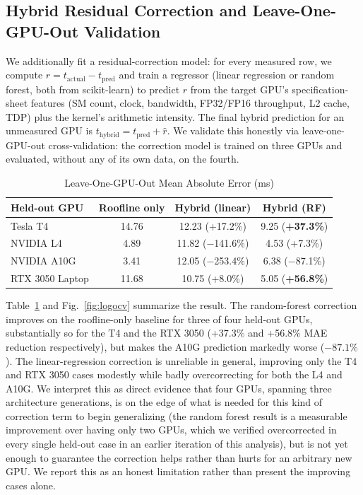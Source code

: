 \documentclass[conference]{IEEEtran}
\begin{document}
\subsection{Hybrid Residual Correction and Leave-One-GPU-Out Validation}

We additionally fit a residual-correction model: for every measured row, we compute
$r = t_{\text{actual}} - t_{\text{pred}}$ and train a regressor (linear regression or random
forest, both from scikit-learn) to predict $r$ from the target GPU's specification-sheet features
(SM count, clock, bandwidth, FP32/FP16 throughput, L2 cache, TDP) plus the kernel's arithmetic
intensity. The final hybrid prediction for an unmeasured GPU is
$t_{\text{hybrid}} = t_{\text{pred}} + \hat{r}$. We validate this honestly via leave-one-GPU-out
cross-validation: the correction model is trained on three GPUs and evaluated, without any of its
own data, on the fourth.

\begin{table}[htbp]
\caption{Leave-One-GPU-Out Mean Absolute Error (ms)}
\label{tab:logocv}
\centering
\begin{tabular}{@{}lccc@{}}
\toprule
Held-out GPU & Roofline only & Hybrid (linear) & Hybrid (RF) \\
\midrule
Tesla T4 & 14.76 & 12.23 (+17.2\%) & 9.25 (\textbf{+37.3\%}) \\
NVIDIA L4 & 4.89 & 11.82 ($-$141.6\%) & 4.53 (+7.3\%) \\
NVIDIA A10G & 3.41 & 12.05 ($-$253.4\%) & 6.38 ($-$87.1\%) \\
RTX 3050 Laptop & 11.68 & 10.75 (+8.0\%) & 5.05 (\textbf{+56.8\%}) \\
\bottomrule
\end{tabular}
\end{table}

Table~\ref{tab:logocv} and Fig.~\ref{fig:logocv} summarize the result. The random-forest
correction improves on the roofline-only baseline for three of four held-out GPUs, substantially
so for the T4 and the RTX 3050 (+37.3\% and +56.8\% MAE reduction respectively), but makes the
A10G prediction markedly worse ($-87.1\%$). The linear-regression correction is unreliable in
general, improving only the T4 and RTX 3050 cases modestly while badly overcorrecting for both the
L4 and A10G. We interpret this as direct evidence that four GPUs, spanning three architecture
generations, is on the edge of what is needed for this kind of correction term to begin
generalizing (the random forest result is a measurable improvement over having only two GPUs, which
we verified overcorrected in every single held-out case in an earlier iteration of this analysis),
but is not yet enough to guarantee the correction helps rather than hurts for an arbitrary new
GPU. We report this as an honest limitation rather than present the improving cases alone.
\end{document}
